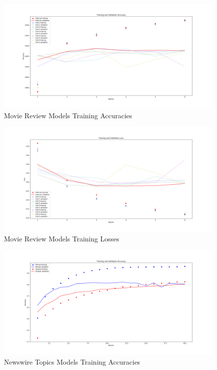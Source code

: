 \documentclass[sigconf]{acmart}
\begin{document}



\appendix

\begin{figure}[h]
  \centering
  \includegraphics[width=\linewidth]{classifyMovieReviews_Accuracy}
  \caption{Movie Review Models Training Accuracies}
  \label{fig:MovieAcc}
\end{figure}

\begin{figure}[h]
  \centering
  \includegraphics[width=\linewidth]{classifyMovieReviews_Loss}
  \caption{Movie Review Models Training Losses}
  \label{fig:MovieLoss}
\end{figure}

\begin{figure}[h]
  \centering
  \includegraphics[width=\linewidth]{classifyNewswireTopics_Accuracy}
  \caption{Newswire Topics Models Training Accuracies}
  \label{fig:NewswireAcc}
\end{figure}
\end{document}
